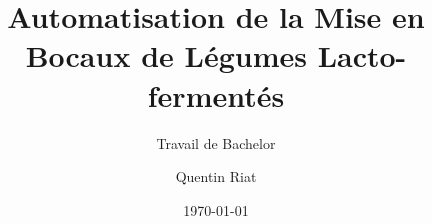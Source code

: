 \author{Quentin Riat}


\title{Automatisation de la Mise en Bocaux de Légumes Lacto-fermentés}

\subtitle{Travail de Bachelor}


\date{\today}

\thesis{-}
